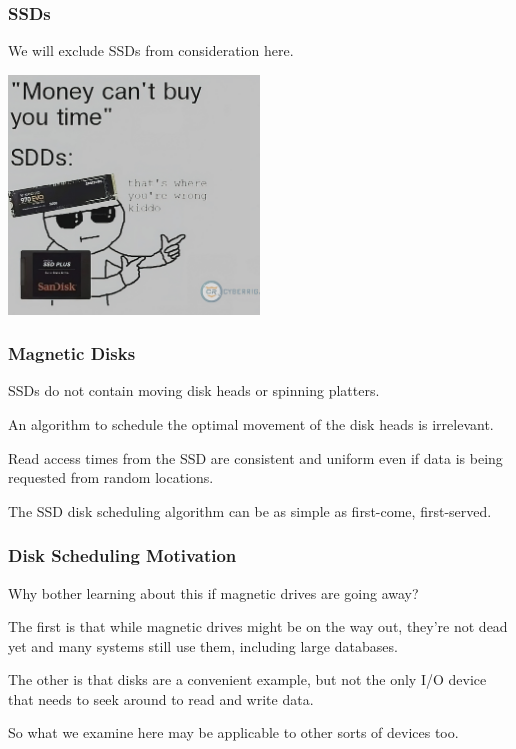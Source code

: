 \begin{frame}
\frametitle{SSDs}

We will exclude SSDs from consideration here. 

\begin{center}
	\includegraphics[width=0.5\textwidth]{images/ssd.png}
\end{center}

 \end{frame}

\begin{frame}
\frametitle{Magnetic Disks}

SSDs do not contain moving disk heads or spinning platters. 

An algorithm to schedule the optimal movement of the disk heads is irrelevant. 

Read access times from the SSD are consistent and uniform even if data is being requested from random locations. 

The SSD disk scheduling algorithm can be as simple as first-come, first-served.


\end{frame}

\begin{frame}
\frametitle{Disk Scheduling Motivation}

Why bother learning about this if magnetic drives are going away? 

The first is that while magnetic drives might be on the way out, they're not dead yet and many systems still use them, including large databases. 

The other is that disks are a convenient example, but not the only I/O device that needs to seek around to read and write data.

So what we examine here may be applicable to other sorts of devices too.

\end{frame}

